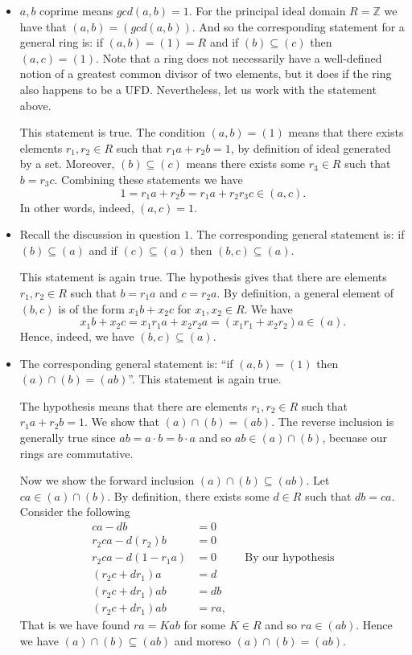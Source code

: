 \documentclass[12pt,letterpaper,boxed]{hmcpset}
\newcommand{\Z}{\mathbb Z}
\begin{document}
\begin{solution}
\begin{itemize}
\item $a,b$ coprime means $gcd(a,b) = 1$. For the principal ideal
domain $R = \Z$ we have that $(a,b) = (gcd(a,b))$. And so the
corresponding statement for a general ring is:
if $(a,b) = (1) = R$ and if $(b) \subseteq (c)$ then $(a,c) = (1)$. 
Note that a ring does not necessarily have a well-defined notion of a
greatest common divisor of two elements, but it does if the ring also
happens to be a UFD. Nevertheless, let us work with the statement
above.

This statement is true. The condition $(a,b) = (1)$ means that there
exists elements $r_1, r_2 \in R$ such that $r_1a + r_2b = 1$, by
definition of ideal generated by a set. Moreover, $(b) \subseteq (c)$
means there exists some $r_3 \in R$ such that $b = r_3 c$. Combining
these statements we have \[
	1 = r_1a + r_2 b = r_1 a + r_2r_3 c \in (a,c). 
\]
In other words, indeed, $(a,c) = 1$. 

\item Recall the discussion in question $1$. The corresponding general
statement is: if $(b) \subseteq (a)$ and if $(c) \subseteq (a)$ then
$(b,c) \subseteq (a)$. 

This statement is again true. The hypothesis gives that there are
elements $r_1, r_2 \in R$ such that $b = r_1a$ and $c = r_2 a$. By
definition, a general element of $(b,c)$ is of the form $x_1 b + x_2
c$ for $x_1, x_2 \in R$. We have
\[
	x_1 b + x_2 c = x_1r_1 a + x_2r_2 a = (x_1 r_1 + x_2r_2) a \in (a). 
\]
Hence, indeed, we have $(b,c) \subseteq (a)$. 

\item The corresponding general statement is: ``if $(a,b) = (1)$ then
$(a) \cap (b) = (ab)$''. This statement is again true.

The hypothesis means that there are elements $r_1, r_2 \in R$ such
that $r_1 a + r_2 b = 1$. We show that $(a) \cap (b) = (ab)$. The
reverse inclusion is generally true since $ab = a \cdot b = b \cdot a$
and so $ab \in (a) \cap (b)$, becuase our rings are commutative.

Now we show the forward inclusion $(a) \cap (b) \subseteq (ab)$. Let
$ca \in (a) \cap (b)$. By definition, there exists some $d \in R$ such
that $db = ca$. Consider the following
\begin{align*}
	ca - db &= 0 \\
	r_2ca - d(r_2)b &= 0 \\
	r_2ca - d(1 - r_1a) &= 0 && \text{By our hypothesis} \\
	(r_2c + dr_1)a &= d \\
	(r_2c + dr_1)ab &= db \\
	(r_2c + dr_1)ab &= ra,
\end{align*}
That is we have found $ra = Kab$ for some $K \in R$ and so $ra \in
(ab)$. Hence we have $(a) \cap (b) \subseteq (ab)$ and moreso $(a)
\cap (b) = (ab)$.

\end{itemize}
\end{solution}
\end{document}
